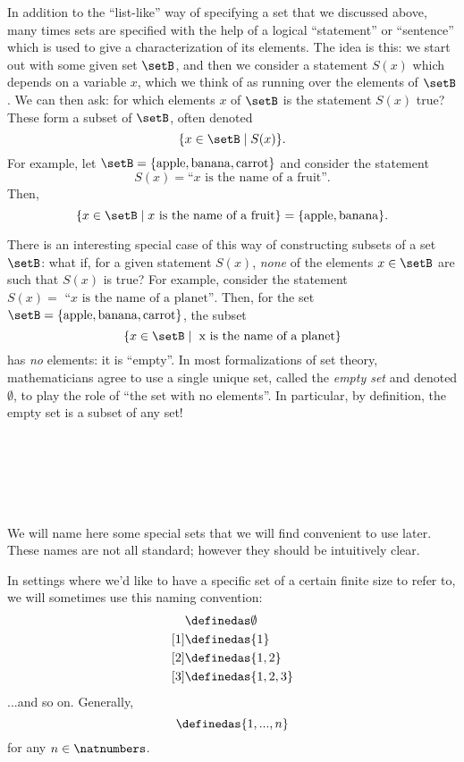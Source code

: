 {In addition to the ``list-like'' way of specifying a set that we discussed above, many times sets are specified with the help of a logical ``statement'' or ``sentence'' which is used to give a characterization of its elements. The idea is this: we start out with some given set $\setB$, and then we consider a statement $S(x)$ which depends on a variable $x$, which we think of as running over the elements of $\setB$. We can then ask: for which elements $x$ of $\setB$ is the statement $S(x)$ true? These form a subset of $\setB$, often denoted 
\begin{equation}
\{ x \in \setB \mid S(x) \}.
\end{equation}
For example, let $\setB = \{ \text{apple}, \text{banana}, \text{carrot} \}$ and consider the statement 
\begin{equation}
S(x) = \text{``} x \text{ is the name of a fruit''}.
\end{equation}
Then, 
\begin{equation}
\{ x \in \setB \mid x \text{ is the name of a fruit} \} = \{ \text{apple}, \text{banana} \}.
\end{equation}

There is an interesting special case of this way of constructing subsets of a set $\setB$: what if, for a given statement $S(x)$, \emph{none} of the elements $x \in \setB$ are such that $S(x)$ is true? For example, consider the statement $S(x) =\text{ ``} x \text{ is the name of a planet''}$. Then, for the set $\setB = \{ \text{apple}, \text{banana}, \text{carrot} \}$, the subset 
\begin{equation}
\{ x \in \setB \mid \text{ x is the name of a planet} \}
\end{equation}
has \emph{no} elements: it is ``empty''. In most formalizations of set theory, mathematicians agree to use a single unique set, called the \emph{empty set} and denoted $\emptyset$, to play the role of ``the set with no elements''. In particular, by definition, the empty set is a subset of any set!


\

\



\


We will name here some special sets that we will find convenient to use later. These names are not all standard; however they should be intuitively clear.

In settings where we'd like to have a specific set of a certain finite size to refer to, we will sometimes use this naming convention:
\begin{align*}
[0]
  & \definedas \emptyset \\
  [1] & \definedas \{ 1\} \\
  [2] & \definedas \{ 1, 2\} \\
  [3] & \definedas \{ 1, 2, 3\}
\end{align*}
...and so on. Generally,
\begin{equation}
[n]
  \definedas \{ 1, ..., n\}
\end{equation}
for any $n \in \natnumbers$.}



\clearpage
